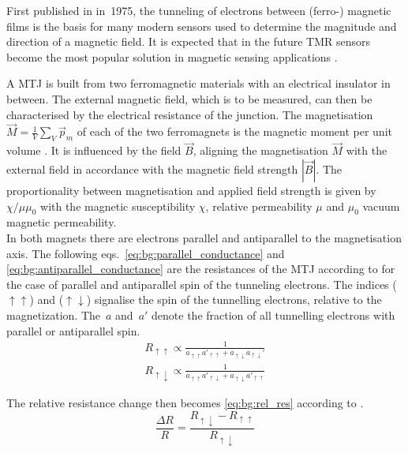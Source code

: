 First published in \parencite{JULLIERE1975} in~1975, the tunneling of electrons between \mbox{(ferro-)} magnetic films is the basis for many modern sensors used to determine the magnitude and direction of a magnetic field. It is expected that in the future \ac{TMR} sensors become the most popular solution in magnetic sensing applications \parencite{yan2022}.

A \ac{MTJ} is built from two ferromagnetic materials with an electrical insulator in between. The external magnetic field, which is to be measured, can then be characterised by the electrical resistance of the junction. The magnetisation $\vec{M}=\frac1V\sum_V\vec{p}_m$ of each of the two ferromagnets is the magnetic moment per unit volume \parencite{Demtröder2017-eo}. It is influenced by the field $\vec{B}$, aligning the magnetisation $\vec{M}$ with the external field in accordance with the magnetic field strength $
|\vec{B}|$. The proportionality between magnetisation and applied field strength is given by $\chi/\mu\mu_0$ with the magnetic susceptibility $\chi$, relative permeability $\mu$ and $\mu_0$ vacuum magnetic permeability.\\
In both magnets there are electrons parallel and antiparallel to the magnetisation axis. The following eqs.~\eqref{eq:bg:parallel_conductance} and \eqref{eq:bg:antiparallel_conductance} are the resistances of the \ac{MTJ} according to \parencite{JULLIERE1975} for the case of parallel and antiparallel spin of the tunneling electrons. The indices ($\uparrow\uparrow$) and ($\uparrow\downarrow$) signalise the spin of the tunnelling electrons, relative to the magnetization. The~$a$ and~$a'$ denote the fraction of all tunnelling electrons with parallel or antiparallel spin.
\begin{align}
    R_{\uparrow\uparrow}\propto \frac{1}{a^{}_{\uparrow\uparrow}a'_{\uparrow\uparrow}+a^{}_{\uparrow\downarrow}a_{\uparrow\downarrow}'}
    \label{eq:bg:parallel_conductance} \\
     R_{\uparrow\downarrow}\propto \frac{1}{a^{}_{\uparrow\uparrow}a'_{\uparrow\downarrow}+a^{}_{\uparrow\downarrow}a'_{\uparrow\uparrow}}
     \label{eq:bg:antiparallel_conductance}
\end{align}

The relative resistance change then becomes \eqref{eq:bg:rel_res} according to \parencite{moodera1995}.
\begin{equation}
    \frac{\Delta R}{R}=\frac{R_{\uparrow\downarrow} - R_{\uparrow\uparrow}}{R_{\uparrow\downarrow}}
    \label{eq:bg:rel_res}
\end{equation}

